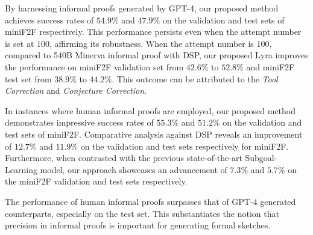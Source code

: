 \documentclass{article} \usepackage{iclr2024_conference,times}
\def\methodOneFull{\textit{Tool Correction}\xspace}
\def\methodTwoFull{\textit{Conjecture Correction}\xspace}
\def\shortname{Lyra\xspace}
\begin{document}
By harnessing informal proofs generated by GPT-4, our proposed method achieves success rates of $54.9\%$ and $47.9\%$ on the validation and test sets of miniF2F respectively. This performance persists even when the attempt number is set at $100$, affirming its robustness. When the attempt number is $100$, compared to 540B Minerva informal proof with DSP, our proposed \shortname improves the performance on miniF2F validation set from $42.6\%$ to $52.8\%$ and miniF2F test set from $38.9\%$ to $44.2\%$. This outcome can be attributed to the \methodOneFull and \methodTwoFull.

In instances where human informal proofs are employed, our proposed method demonstrates impressive success rates of $55.3\%$ and $51.2\%$ on the validation and test sets of miniF2F. Comparative analysis against DSP reveals an improvement of $12.7\%$ and $11.9\%$ on the validation and test sets respectively for miniF2F. Furthermore, when contrasted with the previous state-of-the-art Subgoal-Learning model, our approach showcases an advancement of $7.3\%$ and $5.7\%$ on the miniF2F validation and test sets respectively. 

The performance of human informal proofs surpasses that of GPT-4 generated counterparts, especially on the test set. This substantiates the notion that precision in informal proofs is important for generating formal sketches.
\end{document}
